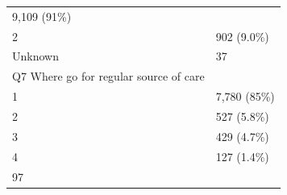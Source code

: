 \documentclass[]{article}
\begin{document}
\begin{longtable}[]{@{}ll@{}}
\begin{minipage}[t]{0.23\columnwidth}
9,109 (91\%)\strut
\end{minipage}\tabularnewline
\begin{minipage}[t]{0.71\columnwidth}\raggedright
2\strut
\end{minipage} & \begin{minipage}[t]{0.23\columnwidth}\raggedright
902 (9.0\%)\strut
\end{minipage}\tabularnewline
\begin{minipage}[t]{0.71\columnwidth}\raggedright
Unknown\strut
\end{minipage} & \begin{minipage}[t]{0.23\columnwidth}\raggedright
37\strut
\end{minipage}\tabularnewline
\begin{minipage}[t]{0.71\columnwidth}\raggedright
Q7 Where go for regular source of care\strut
\end{minipage} & \begin{minipage}[t]{0.23\columnwidth}\raggedright
\strut
\end{minipage}\tabularnewline
\begin{minipage}[t]{0.71\columnwidth}\raggedright
1\strut
\end{minipage} & \begin{minipage}[t]{0.23\columnwidth}\raggedright
7,780 (85\%)\strut
\end{minipage}\tabularnewline
\begin{minipage}[t]{0.71\columnwidth}\raggedright
2\strut
\end{minipage} & \begin{minipage}[t]{0.23\columnwidth}\raggedright
527 (5.8\%)\strut
\end{minipage}\tabularnewline
\begin{minipage}[t]{0.71\columnwidth}\raggedright
3\strut
\end{minipage} & \begin{minipage}[t]{0.23\columnwidth}\raggedright
429 (4.7\%)\strut
\end{minipage}\tabularnewline
\begin{minipage}[t]{0.71\columnwidth}\raggedright
4\strut
\end{minipage} & \begin{minipage}[t]{0.23\columnwidth}\raggedright
127 (1.4\%)\strut
\end{minipage}\tabularnewline
\begin{minipage}[t]{0.71\columnwidth}\raggedright
97\strut
\end{minipage} & \begin{minipage}[t]{0.23\columnwidth}\raggedright

\end{minipage}
\end{longtable}
\end{document}
